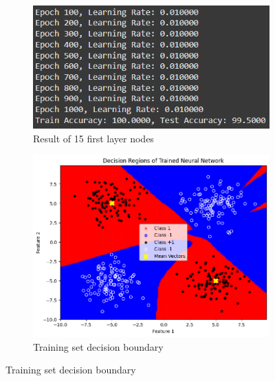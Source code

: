 \documentclass[a4paper,12pt]{article}
\begin{document}
\begin{figure}[H]
    \centering
    \captionsetup[subfigure]{list=true} %

    \begin{subfigure}{0.5\textwidth}
        \centering
        \includegraphics[width=\textwidth]{2.2_15_r.png}
        \caption{Result of 15 first layer nodes}
    \end{subfigure}
    \begin{subfigure}{0.45\textwidth}
        \centering
        \includegraphics[width=\textwidth]{2.2_15_Train.png}
        \caption{Training set decision boundary}
    \end{subfigure}


\end{figure}
\end{document}
